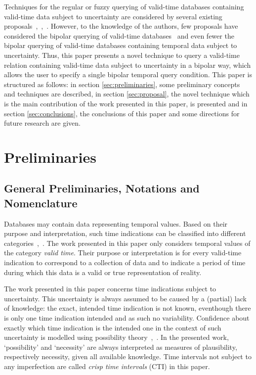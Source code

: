\documentclass[runningheads,a4paper]{llncs}
\begin{document}
Techniques for the regular or fuzzy querying of valid-time databases containing valid-time data subject to uncertainty are considered by several existing proposals~\cite{Pons2012ijcis},~\cite{Pons2012ipmu},~\cite{Pons2013ijufkbs}. However, to the knowledge of the authors, few proposals have considered the bipolar querying of valid-time databases~\cite{Billiet2011fqas} and even fewer the bipolar querying of valid-time databases containing temporal data subject to uncertainty. Thus, this paper presents a novel technique to query a valid-time relation containing valid-time data subject to uncertainty in a bipolar way, which allows the user to specify a single bipolar temporal query condition. This paper is structured as follows: in section \ref{sec:preliminaries}, some preliminary concepts and techniques are described, in section \ref{sec:proposal}, the novel technique which is the main contribution of the work presented in this paper, is presented and in section \ref{sec:conclusions}, the conclusions of this paper and some directions for future research are given.


\section{Preliminaries\label{sec:preliminaries}}

\subsection{General Preliminaries, Notations and Nomenclature}
Databases may contain data representing temporal values. Based on their purpose and interpretation, such time indications can be classified into different categories~\cite{Bohlen1998lncs},~\cite{Billiet2012ipmu}. The work presented in this paper only considers temporal values of the category \emph{valid time}. Their purpose or interpretation is for every valid-time indication to correspond to a collection of data and to indicate a period of time during which this data is a valid or true representation of reality.

The work presented in this paper concerns time indications subject to uncertainty. This uncertainty is always assumed to be caused by a (partial) lack of knowledge: the exact, intended time indication is not known, eventhough there is only one time indication intended and as such no variability. Confidence about exactly which time indication is the intended one in the context of such uncertainty is modelled using possibility theory~\cite{Dubois1988},~\cite{Pons2013ijufkbs}. In the presented work, `possibility' and `necessity' are always interpreted as measures of plausibility, respectively necessity, given all available knowledge. Time intervals not subject to any imperfection are called \emph{crisp time intervals} (CTI) in this paper.
\end{document}
